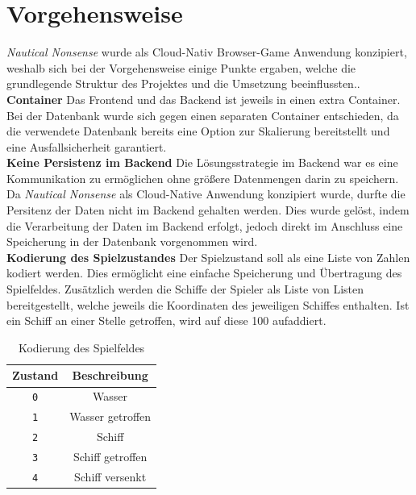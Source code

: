 \documentclass[a4paper, 10pt, conference]{IEEEtran}
\begin{document}
\section{Vorgehensweise}\label{sec:vorgehensweise}
\textit{Nautical Nonsense} wurde als Cloud-Nativ Browser-Game Anwendung konzipiert, weshalb sich bei der Vorgehensweise einige Punkte ergaben, welche die grundlegende Struktur des Projektes und die Umsetzung beeinflussten..\\

\textbf{Container} Das Frontend und das Backend ist jeweils in einen extra Container. Bei der Datenbank wurde sich gegen einen separaten Container entschieden, da die verwendete Datenbank bereits eine Option zur Skalierung bereitstellt und eine Ausfallsicherheit garantiert. \\

\textbf{Keine Persistenz im Backend} Die Lösungsstrategie im Backend war es eine Kommunikation zu ermöglichen ohne größere Datenmengen darin zu speichern. Da \textit{Nautical Nonsense} als Cloud-Native Anwendung konzipiert wurde, durfte die Persitenz der Daten nicht im Backend gehalten werden. Dies wurde gelöst, indem die Verarbeitung der Daten im Backend erfolgt, jedoch direkt im Anschluss eine Speicherung in der Datenbank vorgenommen wird. \\

\textbf{Kodierung des Spielzustandes} 
Der Spielzustand soll als eine Liste von Zahlen kodiert werden. Dies ermöglicht eine einfache Speicherung und Übertragung des Spielfeldes. 
Zusätzlich werden die Schiffe der Spieler als Liste von Listen bereitgestellt, welche jeweils die Koordinaten des jeweiligen Schiffes enthalten. Ist ein Schiff an einer Stelle getroffen, wird auf diese 100 aufaddiert. \\

\begin{table}[h!]
    \begin{center}
        \caption{Kodierung des Spielfeldes}
        \label{tab:gamefield}
        \begin{tabular}{|c|c|}
            \textbf{Zustand} & \textbf{Beschreibung}\\
            \hline
            \texttt{0}	& Wasser\\
            \texttt{1}	& Wasser getroffen\\
            \texttt{2}	& Schiff\\
            \texttt{3}	& Schiff getroffen\\
            \texttt{4}	& Schiff versenkt\\
        \end{tabular}
    \end{center}
\end{table}
\end{document}
